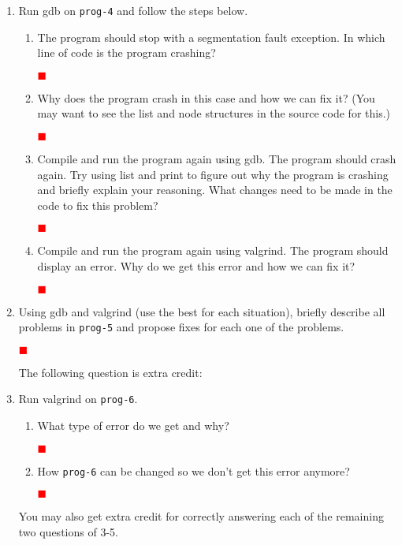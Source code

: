 \documentclass[12pt]{article}
\newcounter{problem}
\newenvironment{solution}{\par\textcolor{green!50!black}\bgroup}{\egroup\par}
\newcommand{\TODO}{\textcolor{red}{$\blacksquare$}}
\begin{document}
\begin{enumerate}
\item Run gdb on \texttt{prog-4} and follow the steps below.
  \begin{enumerate}
  \item The program should stop with a segmentation fault exception. In which line
    of code is the program crashing?
    \begin{solution}
  \textbf{\textcolor{red}{\TODO}}
    \end{solution}
  \item Why does the program crash in this case and how we can fix it? (You may
    want to see the list and node structures in the source code for this.)
    \begin{solution}
  \textbf{\textcolor{red}{\TODO}}
    \end{solution}
  \item Compile and run the program again using gdb. The program should crash
    again. Try using list and print to figure out why the program is crashing and
    briefly explain your reasoning. What changes need to be made in the code to
    fix this problem?
    \begin{solution}
  \textbf{\textcolor{red}{\TODO}}
    \end{solution}
  \item Compile and run the program again using valgrind. The program should
    display an error. Why do we get this error and how we can fix it?
    \begin{solution}
  \textbf{\textcolor{red}{\TODO}}
    \end{solution}
  \end{enumerate}

\item Using gdb and valgrind (use the best for each situation), briefly describe
  all problems in \texttt{prog-5} and propose fixes for each one of the
  problems.
  \begin{solution}
  \textbf{\textcolor{red}{\TODO}}
  \end{solution}

\pagebreak
The following question is extra credit:

\item Run valgrind on \texttt{prog-6}.
\begin{enumerate}
\item What type of error do we get and why?
  \begin{solution}
  \textbf{\textcolor{red}{\TODO}}
  \end{solution}
\item How \texttt{prog-6} can be changed so we don't get this error anymore?
  \begin{solution}
  \textbf{\textcolor{red}{\TODO}}
  \end{solution}
\end{enumerate}

You may also get extra credit for correctly answering each of the remaining two questions of 3-5.



\end{enumerate}
\end{document}
